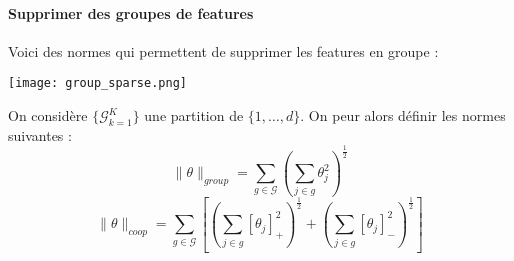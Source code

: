 \paragraph{Supprimer des groupes de features}
Voici des normes qui permettent de supprimer les features en groupe :
\begin{center}
	\texttt{[image: group\_sparse.png]}
\end{center}
On considère $\{ \mathcal{G}_{k = 1}^K \}$ une partition de $\{ 1, \dots, d \}$. On peur alors définir les normes suivantes :
$$ \| \theta \|_{group} = \sum_{g \in \mathcal{G}} \left( \sum_{j \in g} \theta_j^2 \right)^{\frac{1}{2}} $$
$$ \| \theta \|_{coop} = \sum_{g \in \mathcal{G}} \left[ \left( \sum_{j \in g} [\theta_j]_+^2 \right)^{\frac{1}{2}} + \left( \sum_{j \in g} [\theta_j]_-^2 \right)^{\frac{1}{2}} \right] $$




